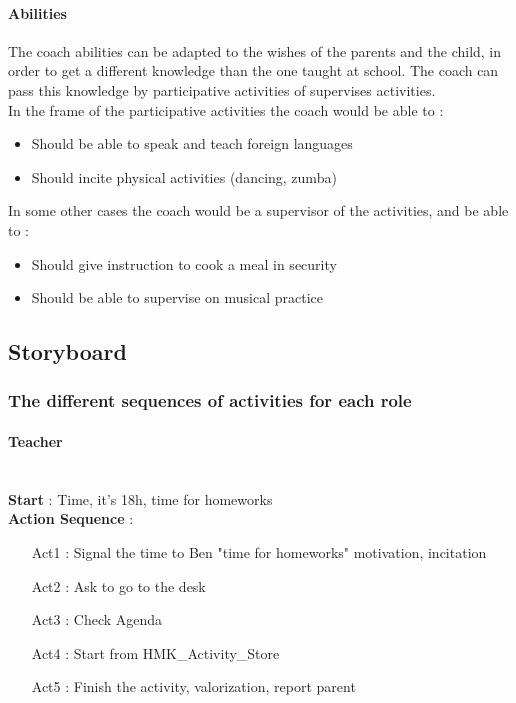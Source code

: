 \paragraph{Abilities}
The coach abilities can be adapted to the wishes of the parents and the child, in order to get a different knowledge than the one taught at school.
The coach can pass this knowledge by participative activities of supervises activities. \\
In the frame of the participative activities the coach would be able to : 
\begin{itemize}
\item Should be able to speak and teach foreign languages
\item Should incite physical activities (dancing, zumba)
\end{itemize}
In some other cases the coach would be a supervisor of the activities, and be able to : 
\begin{itemize}
\item Should give instruction to cook a meal in security
\item Should be able to supervise on musical practice
\end{itemize}

\subsection{Storyboard}
\subsubsection{The different sequences of activities for each role}
\paragraph{Teacher} \\
\textbf{Start} : Time, it's 18h, time for homeworks \\
\textbf{Action Sequence} : 
\begin{itemize}
\item[Act1] : Signal the time to Ben "time for homeworks" \- motivation, incitation
\item[Act2] : Ask to go to the desk
\item[Act3] : Check Agenda
\item[Act4] : Start from HMK\_Activity\_Store
\item[Act5] : Finish the activity, valorization, report parent
\end{itemize}



